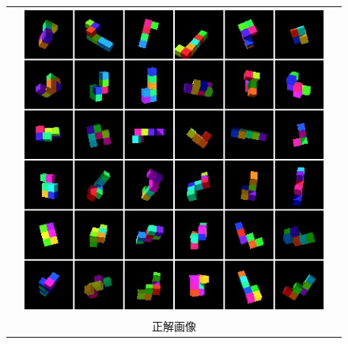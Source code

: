 \begin{figure}[tbp]
  \begin{center}
    \begin{tabular}{ccc}
      &
      \begin{minipage}{0.33\linewidth}
        \begin{center}
          \includegraphics[width=\linewidth]{./figures/groundtruth.png}
        \end{center}
      \end{minipage}
      & \\
      &正解画像&\\
      

\end{tabular}
\end{center}
\end{figure}
